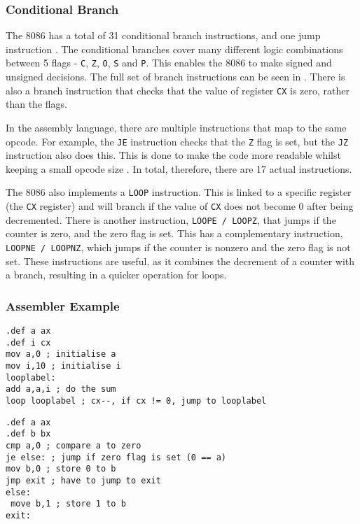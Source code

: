 \documentclass[12pt,a4paper]{article}
\begin{document}
\begin{bibunit}[is-unsrt]
\subsubsection{Conditional Branch}

The 8086 has a total of 31 conditional branch instructions, and one jump instruction \cite{Intel:instructionset}.
The conditional branches cover many different logic combinations between 5 flags - \texttt{C}, \texttt{Z}, \texttt{O}, \texttt{S} and \texttt{P}.
This enables the 8086 to make signed and unsigned decisions.
The full set of branch instructions can be seen in \cite{Intel:condjumps}.
There is also a branch instruction that checks that the value of register \texttt{CX} is zero, rather than the flags. 

In the assembly language, there are multiple instructions that map to the same opcode.
For example, the \texttt{JE} instruction checks that the \texttt{Z} flag is set, but the \texttt{JZ} instruction also does this.
This is done to make the code more readable whilst keeping a small opcode size \cite{Intel:datasheet}.
In total, therefore, there are 17 actual instructions.

The 8086 also implements a \texttt{LOOP} instruction.
This is linked to a specific register (the \texttt{CX} register) and will branch if the value of \texttt{CX} does not become $0$ after being decremented.
There is another instruction, \texttt{LOOPE / LOOPZ}, that jumps if the counter is zero, and the zero flag is set. 
This has a complementary instruction, \texttt{LOOPNE / LOOPNZ}, which jumps if the counter is nonzero and the zero flag is not set.
These instructions are useful, as it combines the decrement of a counter with a branch, resulting in a quicker operation for loops.


\subsubsection{Assembler Example}
\begin{lstlisting}[frame=single,caption=Intel 8086 assembler for listing \ref{ListC},label=intel1]
.def a ax
.def i cx
mov a,0 ; initialise a
mov i,10 ; initialise i
looplabel: 
add a,a,i ; do the sum
loop looplabel ; cx--, if cx != 0, jump to looplabel
\end{lstlisting}

\begin{lstlisting}[frame=single,caption=Intel 8086 assembler for listing \ref{ListC2},label=intel2]
.def a ax
.def b bx
cmp a,0 ; compare a to zero
je else: ; jump if zero flag is set (0 == a)
mov b,0 ; store 0 to b
jmp exit ; have to jump to exit
else:
 move b,1 ; store 1 to b
exit:


\end{lstlisting}
\end{bibunit}
\end{document}
